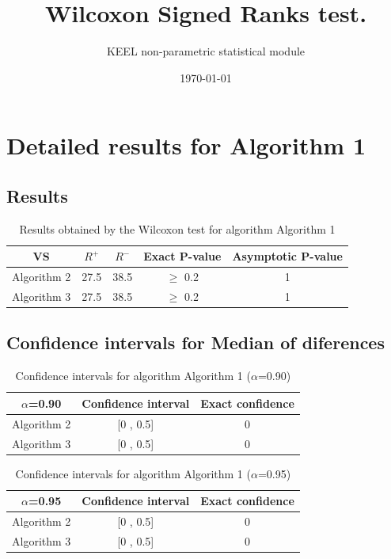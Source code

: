\documentclass[a4paper,10pt]{article}
\title{Wilcoxon Signed Ranks test.}
\date{\today}
\author{KEEL non-parametric statistical module}
\begin{document}
\pagestyle{empty}
\maketitle
\thispagestyle{empty}



\section{Detailed results for Algorithm 1}


\subsection{Results}

\begin{table}[!htp]
\centering\small
\begin{tabular}{
|c|c|c|c|c|}
\hline
 VS & $R^{+}$ & $R^{-}$ & Exact P-value & Asymptotic P-value \\ \hline 
Algorithm 2 & 27.5 & 38.5 & $\geq$ 0.2 & 1\\ \hline 
Algorithm 3 & 27.5 & 38.5 & $\geq$ 0.2 & 1\\ \hline 

\end{tabular}
\caption{Results obtained by the Wilcoxon test for algorithm Algorithm 1}
\end{table}

\subsection{Confidence intervals for Median of diferences}

\begin{table}[!htp]
\centering\small
\begin{tabular}{
|c|c|c|}
\hline
 $\alpha$=0.90 & Confidence interval & Exact confidence \\ \hline 
Algorithm 2 & [0 , 0.5] & 0\\ \hline 
Algorithm 3 & [0 , 0.5] & 0\\ \hline 

\end{tabular}
\caption{Confidence intervals for algorithm Algorithm 1 ($\alpha$=0.90)}
\end{table}
\begin{table}[!htp]
\centering\small
\begin{tabular}{
|c|c|c|}
\hline
 $\alpha$=0.95 & Confidence interval & Exact confidence \\ \hline 
Algorithm 2 & [0 , 0.5] & 0\\ \hline 
Algorithm 3 & [0 , 0.5] & 0\\ \hline 

\end{tabular}
\caption{Confidence intervals for algorithm Algorithm 1 ($\alpha$=0.95)}
\end{table}
\end{document}

